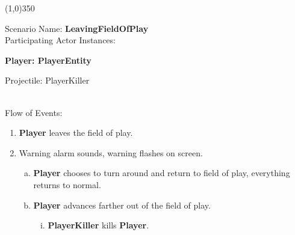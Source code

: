 \documentclass[12pt]{article}       %
\begin{document}
\begin{center} \line(1,0){350} \end{center}
Scenario Name: {\bf LeavingFieldOfPlay} \\
Participating Actor Instances:        \hspace{46pt} {\bf Player: PlayerEntity

					          \hspace{2.6 in}  Projectile: PlayerKiller}  \vspace{10pt}  \\ 
Flow of Events: 
\begin{enumerate} 
\item {\bf Player} leaves the field of play.
\item Warning alarm sounds, warning flashes on screen.
      \begin{enumerate}[a.]
       \item {\bf Player} chooses to turn around and return to field of play, everything returns to normal.
       \item {\bf Player} advances farther out of the field of play.
                \begin{enumerate}[i.]
                \item {\bf PlayerKiller} kills {\bf Player}.
                \end{enumerate}
        \end{enumerate}
\end{enumerate}
\end{document}
